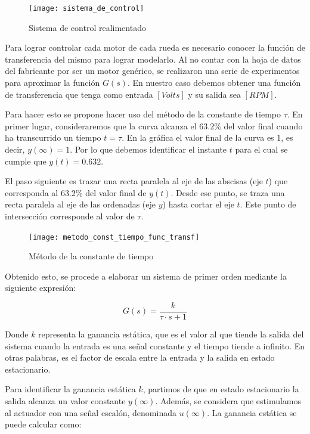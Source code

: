 \begin{figure}[H]
    \centering
    \texttt{[image: sistema\_de\_control]}
    \caption{Sistema de control realimentado}
    \label{fig:sistcontrolrealim}
\end{figure}

Para lograr controlar cada motor de cada rueda es necesario conocer la función de transferencia del mismo para lograr modelarlo. Al no contar con la hoja de datos del fabricante por ser un motor genérico, se realizaron una serie de experimentos para aproximar la función $G(s)$. En nuestro caso debemos obtener una función de transferencia que tenga como entrada $[Volts]$ y su salida sea $[RPM]$.

Para hacer esto se propone hacer uso del método de la constante de tiempo $\tau$. En primer lugar, consideraremos que la curva alcanza el $63.2\%$  del valor final cuando ha transcurrido un tiempo $t=\tau$. En la gráfica el valor final de la curva es 1, es decir, $y(\infty)=1$. Por lo que debemos identificar el instante $t$ para el cual se cumple que $y(t)=0.632$.

El paso siguiente es trazar una recta paralela al eje de las abscisas (eje $t$) que corresponda al $63.2\%$ del valor final de $y(t)$. Desde ese punto, se traza una recta paralela al eje de las ordenadas (eje $y$) hasta cortar el eje $t$. Este punto de intersección corresponde al valor de $\tau$.

\begin{figure}[H]
    \centering
    \texttt{[image: metodo\_const\_tiempo\_func\_transf]}
    \caption{Método de la constante de tiempo}
    \label{fig:metodoctetiempo}
\end{figure}

Obtenido esto, se procede a elaborar un sistema de primer orden mediante la siguiente expresión:

$$ G(s) = \frac{k}{\tau \cdot s + 1} $$

Donde $k$ representa la ganancia estática, que es el valor al que tiende la salida del sistema cuando la entrada es una señal constante y el tiempo tiende a infinito. En otras palabras, es el factor de escala entre la entrada y la salida en estado estacionario.

Para identificar la ganancia estática $k$, partimos de que en estado estacionario la salida alcanza un valor constante $y(\infty)$. Además, se considera que estimulamos al actuador con una señal escalón, denominada $u(\infty)$. La ganancia estática se puede calcular como:

